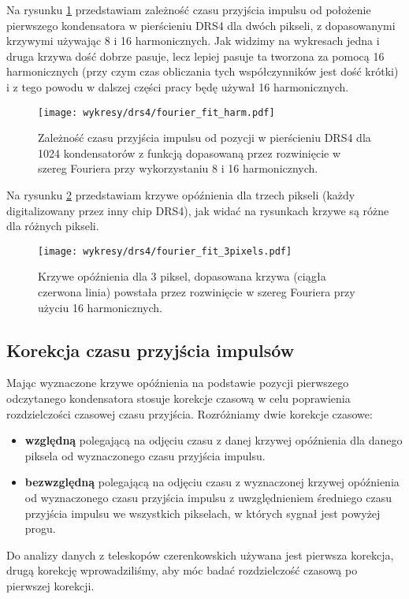 \documentclass[a4paper,11pt,twoside]{article}
\begin{document}
Na rysunku \ref{fig:fourier_fit_harm} przedstawiam zależność czasu przyjścia impulsu od położenie pierwszego kondensatora w pierścieniu DRS4 dla dwóch pikseli, z dopasowanymi krzywymi używając 8 i 16 harmonicznych. Jak widzimy na wykresach jedna i druga krzywa dość dobrze pasuje, lecz lepiej pasuje ta tworzona za pomocą 16 harmonicznych (przy czym czas obliczania tych współczynników jest dość krótki) i z tego powodu w dalszej części pracy będę używał 16 harmonicznych.
\begin{figure}[H] 
\centering
\texttt{[image: wykresy/drs4/fourier\_fit\_harm.pdf]}
\caption{Zależność czasu przyjścia impulsu od pozycji w pierścieniu DRS4 dla 1024 kondensatorów z funkcją dopasowaną przez rozwinięcie w szereg Fouriera przy wykorzystaniu 8 i 16 harmonicznych.}
\label{fig:fourier_fit_harm}
\end{figure}
Na rysunku \ref{fig:fourier_fit_3} przedstawiam krzywe opóźnienia dla trzech pikseli (każdy digitalizowany przez inny chip DRS4), jak widać na rysunkach krzywe są różne dla różnych pikseli. 
\begin{figure}[H] 
\centering
\texttt{[image: wykresy/drs4/fourier\_fit\_3pixels.pdf]}
\caption{Krzywe opóźnienia dla 3 piksel, dopasowana krzywa (ciągła czerwona linia) powstała przez rozwinięcie w szereg Fouriera przy użyciu 16 harmonicznych.}
\label{fig:fourier_fit_3}
\end{figure}
\subsection{Korekcja czasu przyjścia impulsów}
Mając wyznaczone krzywe opóźnienia na podstawie pozycji pierwszego odczytanego kondensatora stosuje korekcje czasową w celu poprawienia rozdzielczości czasowej czasu przyjścia. Rozróżniamy dwie korekcje czasowe:
\begin{itemize}
\item {\bf{względną}} polegającą na odjęciu czasu z danej krzywej opóźnienia dla danego piksela od wyznaczonego czasu przyjścia impulsu.
\item {\bf{bezwzględną}} polegającą na odjęciu czasu z wyznaczonej krzywej opóźnienia od wyznaczonego czasu przyjścia impulsu z uwzględnieniem średniego czasu przyjścia impulsu we wszystkich pikselach, w których sygnał jest powyżej progu.
\end{itemize} 
Do analizy danych z teleskopów czerenkowskich używana jest pierwsza korekcja, drugą korekcję wprowadziliśmy, aby móc badać rozdzielczość czasową po pierwszej korekcji.
\end{document}

